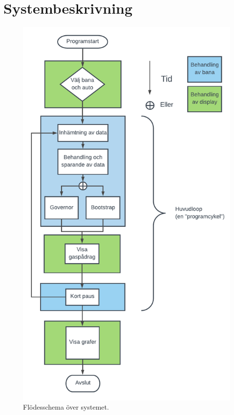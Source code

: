 \section{Systembeskrivning}

\begin{figure}
	\centering
	\includegraphics [height=0.8\textheight] {Figures/flow}
	\caption{Flödesschema över systemet.}
	\label{fig:flow}
\end{figure}

